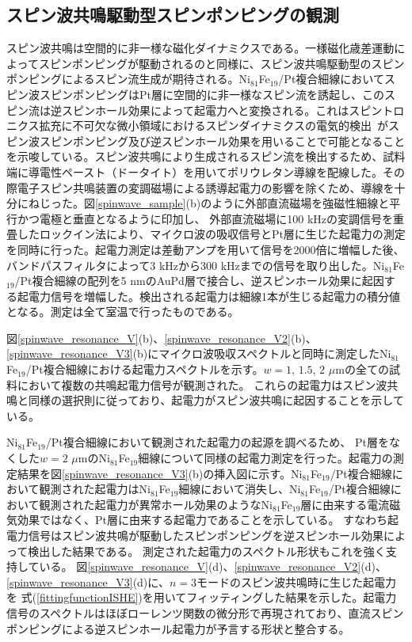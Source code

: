 \subsection{スピン波共鳴駆動型スピンポンピングの観測}

スピン波共鳴は空間的に非一様な磁化ダイナミクスである。一様磁化歳差運動によってスピンポンピングが駆動されるのと同様に、スピン波共鳴駆動型のスピンポンピングによるスピン流生成が期待される。Ni$_{81}$Fe$_{19}$/Pt複合細線においてスピン波スピンポンピングはPt層に空間的に非一様なスピン流を誘起し、このスピン流は逆スピンホール効果によって起電力へと変換される。これはスピントロニクス拡充に不可欠な微小領域におけるスピンダイナミクスの電気的検出~\cite{hui,gui,GuiDYNAMO}がスピン波スピンポンピング及び逆スピンホール効果を用いることで可能となることを示唆している。スピン波共鳴により生成されるスピン流を検出するため、試料端に導電性ペースト（ドータイト）を用いてポリウレタン導線を配線した。その際電子スピン共鳴装置の変調磁場による誘導起電力の影響を除くため、導線を十分にねじった。図\ref{spinwave_sample}(b)のように外部直流磁場を強磁性細線と平行かつ電極と垂直となるように印加し、
外部直流磁場に100 kHzの変調信号を重畳したロックイン法により、マイクロ波の吸収信号とPt層に生じた起電力の測定を同時に行った。起電力測定は差動アンプを用いて信号を2000倍に増幅した後、バンドパスフィルタによって3 kHzから300 kHzまでの信号を取り出した。Ni$_{81}$Fe$_{19}$/Pt複合細線の配列を5 nmのAuPd層で接合し、逆スピンホール効果に起因する起電力信号を増幅した。検出される起電力は細線1本が生じる起電力の積分値となる。測定は全て室温で行ったものである。

図\ref{spinwave_resonance_V}(b)、\ref{spinwave_resonance_V2}(b)、\ref{spinwave_resonance_V3}(b)にマイクロ波吸収スペクトルと同時に測定したNi$_{81}$Fe$_{19}$/Pt複合細線における起電力スペクトルを示す。$w=1$, $1.5$, $2$ $\mu$mの全ての試料において複数の共鳴起電力信号が観測された。
これらの起電力はスピン波共鳴と同様の選択則に従っており、起電力がスピン波共鳴に起因することを示している。

Ni$_{81}$Fe$_{19}$/Pt複合細線において観測された起電力の起源を調べるため、
Pt層をなくした$w=2$ $\mu$mのNi$_{81}$Fe$_{19}$細線について同様の起電力測定を行った。起電力の測定結果を図\ref{spinwave_resonance_V3}(b)の挿入図に示す。Ni$_{81}$Fe$_{19}$/Pt複合細線において観測された起電力はNi$_{81}$Fe$_{19}$細線において消失し、Ni$_{81}$Fe$_{19}$/Pt複合細線において観測された起電力が異常ホール効果のようなNi$_{81}$Fe$_{19}$層に由来する電流磁気効果ではなく、Pt層に由来する起電力であることを示している。
すなわち起電力信号はスピン波共鳴が駆動したスピンポンピングを逆スピンホール効果によって検出した結果である。
測定された起電力のスペクトル形状もこれを強く支持している。
図\ref{spinwave_resonance_V}(d)、\ref{spinwave_resonance_V2}(d)、\ref{spinwave_resonance_V3}(d)に、$n=3$モードのスピン波共鳴時に生じた起電力を
式(\ref{fittingfunctionISHE})を用いてフィッティングした結果を示した。起電力信号のスペクトルはほぼローレンツ関数の微分形で再現されており、直流スピンポンピングによる逆スピンホール起電力が予言する形状と整合する。

